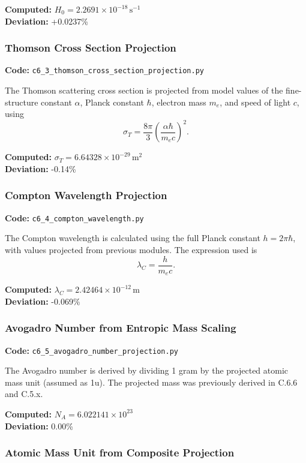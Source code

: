 \documentclass[10.5pt,a4paper]{article}
\begin{document}
\textbf{Computed:} \(H_0 = 2.2691 \times 10^{-18}\,\mathrm{s}^{-1}\) \\
\textbf{Deviation:} +0.0237\%

\subsubsection{Thomson Cross Section Projection}

\textbf{Code:} \texttt{c6\_3\_thomson\_cross\_section\_projection.py}

The Thomson scattering cross section is projected from model values of the fine-structure constant \(\alpha\), Planck constant \(\hbar\), electron mass \(m_e\), and speed of light \(c\), using
\[
\sigma_T = \frac{8\pi}{3} \left( \frac{\alpha \hbar}{m_e c} \right)^2.
\]

\textbf{Computed:} \(\sigma_T = 6.64328 \times 10^{-29}\,\mathrm{m}^2\) \\
\textbf{Deviation:} -0.14\%

\subsubsection{Compton Wavelength Projection}

\textbf{Code:} \texttt{c6\_4\_compton\_wavelength.py}

The Compton wavelength is calculated using the full Planck constant \( h = 2\pi\hbar \), with values projected from previous modules. The expression used is
\[
\lambda_C = \frac{h}{m_e c}.
\]

\textbf{Computed:} \(\lambda_C = 2.42464 \times 10^{-12}\,\mathrm{m}\) \\
\textbf{Deviation:} -0.069\%

\subsubsection{Avogadro Number from Entropic Mass Scaling}

\textbf{Code:} \texttt{c6\_5\_avogadro\_number\_projection.py}

The Avogadro number is derived by dividing 1 gram by the projected atomic mass unit (assumed as 1u). The projected mass was previously derived in C.6.6 and C.5.x.

\textbf{Computed:} \(N_A = 6.022141 \times 10^{23}\) \\
\textbf{Deviation:} 0.00\%

\subsubsection{Atomic Mass Unit from Composite Projection}
\end{document}
